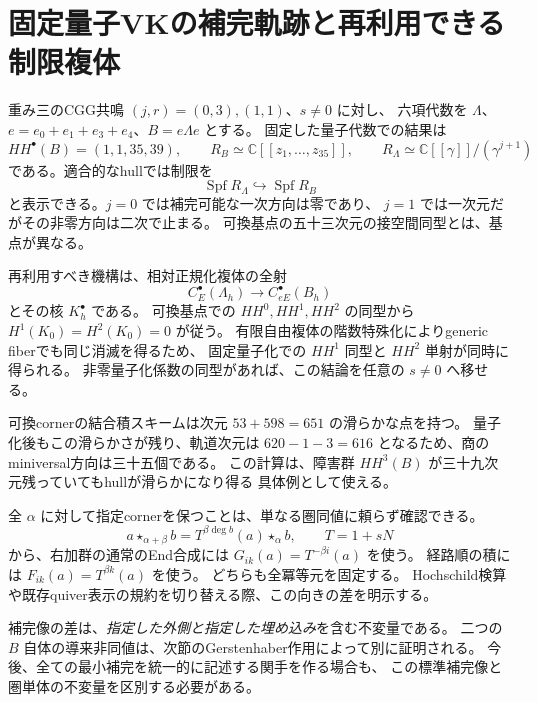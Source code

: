 \section{固定量子VKの補完軌跡と再利用できる制限複体}

重み三のCGG共鳴 $(j,r)=(0,3),(1,1)$、$s\ne0$ に対し、
六項代数を $\Lambda$、$e=e_0+e_1+e_3+e_4$、$B=e\Lambda e$ とする。
固定した量子代数での結果は
\[
 HH^\bullet(B)=(1,1,35,39),\qquad
 R_B\simeq\mathbb C[[z_1,\ldots,z_{35}]],\qquad
 R_\Lambda\simeq\mathbb C[[\gamma]]/(\gamma^{j+1})
\]
である。適合的なhullでは制限を
\[
 \operatorname{Spf}R_\Lambda\hookrightarrow\operatorname{Spf}R_B
\]
と表示できる。$j=0$ では補完可能な一次方向は零であり、
$j=1$ では一次元だがその非零方向は二次で止まる。
可換基点の五十三次元の接空間同型とは、基点が異なる。

再利用すべき機構は、相対正規化複体の全射
\[
 C_E^\bullet(\Lambda_h)\longrightarrow C_{eE}^\bullet(B_h)
\]
とその核 $K_h^\bullet$ である。
可換基点での $HH^0,HH^1,HH^2$ の同型から $H^1(K_0)=H^2(K_0)=0$ が従う。
有限自由複体の階数特殊化によりgeneric fiberでも同じ消滅を得るため、
固定量子化での $HH^1$ 同型と $HH^2$ 単射が同時に得られる。
非零量子化係数の同型があれば、この結論を任意の $s\ne0$ へ移せる。

可換cornerの結合積スキームは次元 $53+598=651$ の滑らかな点を持つ。
量子化後もこの滑らかさが残り、軌道次元は
$620-1-3=616$ となるため、商のminiversal方向は三十五個である。
この計算は、障害群 $HH^3(B)$ が三十九次元残っていてもhullが滑らかになり得る
具体例として使える。

全 $\alpha$ に対して指定cornerを保つことは、単なる圏同値に頼らず確認できる。
\[
 a\star_{\alpha+\beta}b=T^{\beta\deg b}(a)\star_\alpha b,
 \qquad T=1+sN
\]
から、右加群の通常のEnd合成には $G_{ik}(a)=T^{-\beta i}(a)$ を使う。
経路順の積には $F_{ik}(a)=T^{\beta k}(a)$ を使う。
どちらも全冪等元を固定する。
Hochschild検算や既存quiver表示の規約を切り替える際、この向きの差を明示する。

補完像の差は、\emph{指定した外側と指定した埋め込み}を含む不変量である。
二つの $B$ 自体の導来非同値は、次節のGerstenhaber作用によって別に証明される。
今後、全ての最小補完を統一的に記述する関手を作る場合も、
この標準補完像と圏単体の不変量を区別する必要がある。
